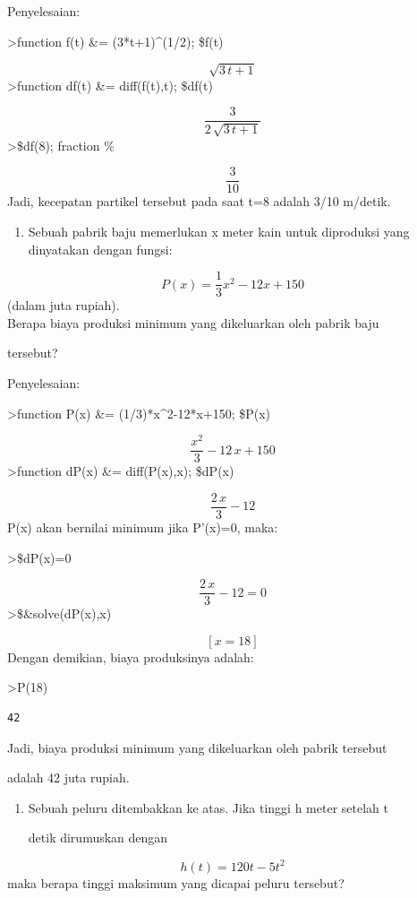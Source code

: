 \documentclass[
]{book}
\providecommand{\tightlist}{%
  \setlength{\itemsep}{0pt}\setlength{\parskip}{0pt}}
\begin{document}
Penyelesaian:

\textgreater function f(t) \&= (3*t+1)\^{}(1/2); \$f(t)

\[\sqrt{3\,t+1}\]\textgreater function df(t) \&= diff(f(t),t); \$df(t)

\[\frac{3}{2\,\sqrt{3\,t+1}}\]\textgreater\$df(8); fraction \%

\[\frac{3}{10}\] Jadi, kecepatan partikel tersebut pada saat t=8 adalah 3/10 m/detik.

\begin{enumerate}
\def\labelenumi{\arabic{enumi}.}
\setcounter{enumi}{1}
\tightlist
\item
  Sebuah pabrik baju memerlukan x meter kain untuk diproduksi yang dinyatakan dengan fungsi:
\end{enumerate}

\[P(x)={\frac{1}{3}}x^2-12x+150\] (dalam juta rupiah).\\
Berapa biaya produksi minimum yang dikeluarkan oleh pabrik baju

tersebut?

Penyelesaian:

\textgreater function P(x) \&= (1/3)*x\^{}2-12*x+150; \$P(x)

\[\frac{x^2}{3}-12\,x+150\]\textgreater function dP(x) \&= diff(P(x),x); \$dP(x)

\[\frac{2\,x}{3}-12\] P(x) akan bernilai minimum jika P'(x)=0, maka:

\textgreater\$dP(x)=0

\[\frac{2\,x}{3}-12=0\]\textgreater\$\&solve(dP(x),x)

\[\left[ x=18 \right] \] Dengan demikian, biaya produksinya adalah:

\textgreater P(18)

\begin{verbatim}
42
\end{verbatim}

Jadi, biaya produksi minimum yang dikeluarkan oleh pabrik tersebut

adalah 42 juta rupiah.

\begin{enumerate}
\def\labelenumi{\arabic{enumi}.}
\setcounter{enumi}{2}
\item
  Sebuah peluru ditembakkan ke atas. Jika tinggi h meter setelah t

  detik dirumuskan dengan
\end{enumerate}

\[h(t)=120t-5t^2\] maka berapa tinggi maksimum yang dicapai peluru tersebut?
\end{document}
